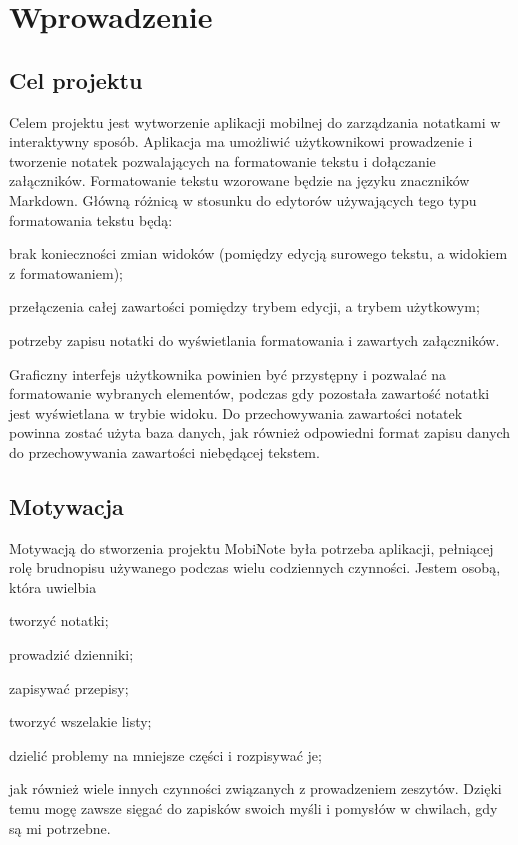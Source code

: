 \documentclass[shortabstract]{iithesis}
\author         {Bartosz Sobocki}
\begin{document}

\chapter{Wprowadzenie}

\section{Cel projektu}

Celem projektu jest wytworzenie aplikacji mobilnej do zarządzania notatkami w interaktywny sposób.
Aplikacja ma umożliwić użytkownikowi prowadzenie i tworzenie notatek pozwalających na formatowanie tekstu i dołączanie załączników.
Formatowanie tekstu wzorowane będzie na języku znaczników Markdown. Główną różnicą w stosunku do edytorów używających tego typu formatowania tekstu będą:
\begin{compactitem}
    \item brak konieczności zmian widoków (pomiędzy edycją surowego tekstu, a widokiem z formatowaniem);
    \item przełączenia całej zawartości pomiędzy trybem edycji, a trybem użytkowym;
    \item potrzeby zapisu notatki do wyświetlania formatowania i zawartych załączników.
\end{compactitem}

Graficzny interfejs użytkownika powinien być przystępny i pozwalać na formatowanie wybranych elementów, podczas gdy pozostała zawartość notatki jest wyświetlana w trybie widoku.
Do przechowywania zawartości notatek powinna zostać użyta baza danych, jak również odpowiedni format zapisu danych do przechowywania zawartości niebędącej tekstem.

\section{Motywacja}

Motywacją do stworzenia projektu MobiNote była potrzeba aplikacji, pełniącej rolę brudnopisu używanego podczas wielu codziennych czynności. Jestem osobą, która uwielbia 

\begin{compactitem}
    \item tworzyć notatki;
    \item prowadzić dzienniki;
    \item zapisywać przepisy;
    \item tworzyć wszelakie listy;
    \item dzielić problemy na mniejsze części i rozpisywać je;
\end{compactitem}
jak również wiele innych czynności związanych z prowadzeniem zeszytów. Dzięki temu mogę zawsze sięgać do zapisków swoich myśli i pomysłów w chwilach, gdy są mi potrzebne.
\end{document}
